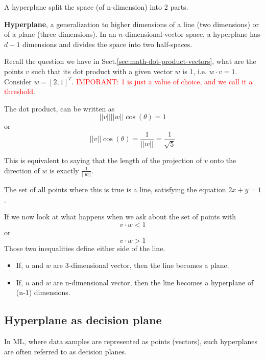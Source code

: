 A hyperplane split the space (of n-dimension) into 2 parts. 

{\bf Hyperplane}, a generalization to higher dimensions of a line (two
dimensions) or of a plane (three dimensions). In an $n$-dimensional vector
space, a hyperplane has $d-1$ dimensions and divides the space into two
half-spaces.


Recall the question we have in Sect.\ref{sec:math-dot-product-vectors}, what are
the points $v$ such that its dot product with a given vector $w$ is 1, i.e.  $w
\cdot v=1$.
Consider $w=[2,1]^T$. \textcolor{red}{IMPORANT: 1 is just a value of choice, and
we call it a threshold}.

The dot product, can be written as 
\begin{equation}
||v|| ||w|| \cos(\theta) = 1
\end{equation}
or
\begin{equation}
||v||  \cos(\theta) = \frac{1}{||w||} = \frac{1}{\sqrt{5}}
\end{equation}

This is equivalent to saying that the length of the projection of $v$ onto the
direction of $w$ is exactly $\frac{1}{||w||}$.

The set of all points where this is true is a line, satisfying the equation
$2x+y=1$.


If we now look at what happens when we ask about the set of points with
\begin{equation}
v \cdot w < 1
\end{equation}
or
\begin{equation}
v \cdot w > 1
\end{equation}
Those two inequalities define either side of the line.

\begin{itemize}
  \item  If, $u$ and $w$ are 3-dimensional vector, then the line becomes a plane. 

  \item If, $u$ and $w$ are n-dimensional vector, then the line becomes a hyperplane of (n-1) dimensions. 
  
\end{itemize}

\subsection{Hyperplane as decision plane}

In ML, where data samples are represented as points (vectors), such hyperplanes
are often referred to as decision planes. 

